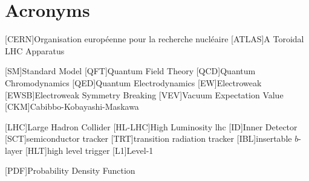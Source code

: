 
\chapter{Acronyms}
\begin{acronym}[neos]
    [CERN]{Organisation européenne pour la recherche nucléaire}
    [ATLAS]{A Toroidal LHC Apparatus}

    [SM]{Standard Model}
    [QFT]{Quantum Field Theory}
    [QCD]{Quantum Chromodynamics}
    [QED]{Quantum Electrodynamics}
    [EW]{Electroweak}
    [EWSB]{Electroweak Symmetry Breaking}
    [VEV]{Vacuum Expectation Value}
    [CKM]{Cabibbo-Kobayashi-Maskawa}

    [LHC]{Large Hadron Collider}
    [HL-LHC]{High Luminosity \acs{lhc}}
    [ID]{Inner Detector}
    [SCT]{semiconductor tracker}
    [TRT]{transition radiation tracker}
    [IBL]{insertable $b$-layer}
    [HLT]{high level trigger}
    [L1]{Level-1}
    
    
    [PDF]{Probability Density Function}


\end{acronym}
